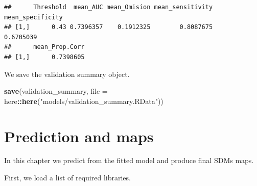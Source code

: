 \documentclass[
]{book}
\newenvironment{Shaded}{\begin{snugshade}}{\end{snugshade}}
\newcommand{\AttributeTok}[1]{\textcolor[rgb]{0.13,0.29,0.53}{#1}}
\newcommand{\CommentTok}[1]{\textcolor[rgb]{0.56,0.35,0.01}{\textit{#1}}}
\newcommand{\FunctionTok}[1]{\textcolor[rgb]{0.13,0.29,0.53}{\textbf{#1}}}
\newcommand{\NormalTok}[1]{#1}
\newcommand{\OtherTok}[1]{\textcolor[rgb]{0.56,0.35,0.01}{#1}}
\newcommand{\SpecialCharTok}[1]{\textcolor[rgb]{0.81,0.36,0.00}{\textbf{#1}}}
\newcommand{\StringTok}[1]{\textcolor[rgb]{0.31,0.60,0.02}{#1}}
\begin{document}
\begin{Shaded}
\end{Shaded}

\begin{verbatim}
##      Threshold  mean_AUC mean_Omision mean_sensitivity mean_specificity
## [1,]      0.43 0.7396357    0.1912325        0.8087675        0.6705039
##      mean_Prop.Corr
## [1,]      0.7398605
\end{verbatim}

We save the validation summary object.

\begin{Shaded}
\begin{Highlighting}[]
\FunctionTok{save}\NormalTok{(validation\_summary, }\AttributeTok{file =}\NormalTok{ here}\SpecialCharTok{::}\FunctionTok{here}\NormalTok{(}\StringTok{"models/validation\_summary.RData"}\NormalTok{))}
\end{Highlighting}
\end{Shaded}

\chapter{Prediction and maps}\label{prediction-and-maps}

In this chapter we predict from the fitted model and produce final SDMs maps.

First, we load a list of required libraries.
\end{document}
